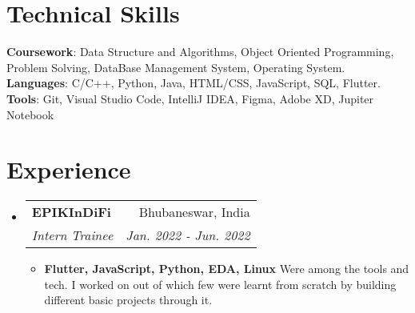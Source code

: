 \documentclass[letterpaper,11pt]{article}
\makeatletter
\newcommand{\resumeItem}[2]{
  \item\small{
    \textbf{#1}{ #2 \vspace{-2pt}}
  }
}
\newcommand{\resumeSubheading}[4]{
  \vspace{-1pt}\item
    \begin{tabular*}{0.97\textwidth}[t]{l@{\extracolsep{\fill}}r}
      \textbf{#1} & #2 \\
      \textit{\small#3} & \textit{\small #4} \\
    \end{tabular*}\vspace{-5pt}
}
\newcommand{\resumeSubSubheading}[2]{
    \begin{tabular*}{0.97\textwidth}{l@{\extracolsep{\fill}}r}
      \textit{\small#1} & \textit{\small #2} \\
    \end{tabular*}\vspace{-5pt}
}
\newcommand{\resumeSubHeadingListStart}{\begin{itemize}[leftmargin=*]}
\newcommand{\resumeSubHeadingListEnd}{\end{itemize}}
\newcommand{\resumeItemListStart}{\begin{itemize}}
\newcommand{\resumeItemListEnd}{\end{itemize}\vspace{-5pt}}
\makeatother
\begin{document}
\section{Technical Skills}
 \begin{itemize}[leftmargin=0.15in, label={}]
	\small{\item{
		\textbf{Coursework}{: Data Structure and Algorithms, Object Oriented Programming, Problem Solving, DataBase Management System, Operating System.} \\
 	\textbf{Languages}{: C/C++, Python, Java, HTML/CSS, JavaScript, SQL, Flutter.} \\
 		\textbf{Tools}{: Git, Visual Studio Code, IntelliJ IDEA, Figma, Adobe XD, Jupiter Notebook}\\
	}}
 \end{itemize}
 \vspace{-16pt}
 

\section{Experience}
  \resumeSubHeadingListStart

    \resumeSubheading
      {EPIKInDiFi}{Bhubaneswar, India}
      {Intern Trainee}{Jan. 2022 - Jun. 2022}
      \resumeItemListStart
        \resumeItem{Flutter, JavaScript, Python, EDA, Linux}
          {Were among the tools and tech. I worked on out of which few were learnt from scratch by building different basic projects through it.}
      \resumeItemListEnd
    \resumeSubHeadingListEnd
      
      

      
%

\end{document}

